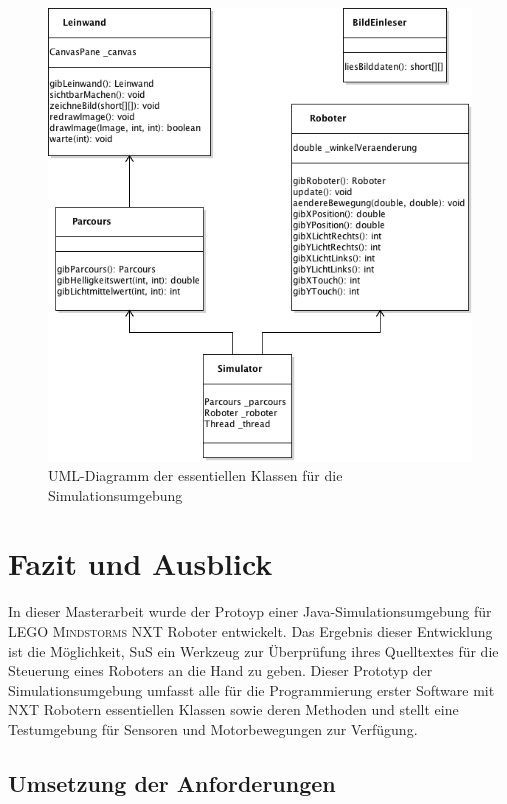 \documentclass[paper=a4, DIV=calc, BCOR=12mm, twoside=on, onecolumn=on, open = right, titlepage =on, parskip =half-, headsepline = on, footsepline = off, chapterprefix = off, appendixprefix = on, fontsize = 12pt, numbers = noenddot, abstract = on]{scrbook}
\begin{document}
\begin{figure}[htbp]
\centering
\hspace{-2.5cm}\includegraphics[scale=0.75]{images/uml_simulator_essenz.png}
\caption[UML-Diagramm der Klassen des Simulators]{UML-Diagramm der essentiellen Klassen für die Simulationsumgebung}
\label{fig:simulator_uml}
\end{figure}


\newpage
\chapter{Fazit und Ausblick}

\onehalfspacing

In dieser Masterarbeit wurde der Protoyp einer Java-Simulations\-um\-ge\-bung für \textsc{LEGO Mindstorms} NXT Roboter entwickelt. Das Ergebnis dieser Entwicklung ist die Möglichkeit, SuS ein Werkzeug zur Überprüfung ihres Quelltextes für die Steuerung eines Roboters an die Hand
zu geben. Dieser Prototyp der Simulationsumgebung umfasst alle für die
Programmierung erster Software mit NXT Robotern essentiellen Klassen sowie deren Methoden und stellt eine Testumgebung für Sensoren und Motorbewegungen zur Verfügung.


\section{Umsetzung der Anforderungen}
\end{document}
